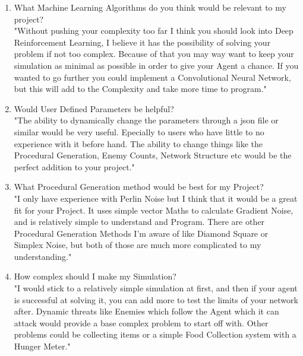 \begin{flushleft}
\begin{enumerate}
                \vspace{0.5cm}
                \item {\large What Machine Learning Algorithms do you think would be relevant to my project?} \\
                \vspace{0.2cm}
                "Without pushing your complexity too far I think you should look into Deep Reinforcement Learning, I believe it has the
                possibility of solving your problem if not too complex. Because of that you may way want to keep your simulation as minimal
                as possible in order to give your Agent a chance. If you wanted to go further you could implement a Convolutional Neural Network, 
                but this will add to the Complexity and take more time to program."

                \vspace{0.5cm}
                \item {\large Would User Defined Parameters be helpful?} \\
                \vspace{0.2cm}
                "The ability to dynamically change the parameters through a json file or similar would be very useful. Epecially to users who
                have little to no experience with it before hand. The ability to change things like the Procedural Generation, Enemy Counts, 
                Network Structure etc would be the perfect addition to your project."

                \vspace{0.5cm}
                \item {\large What Procedural Generation method would be best for my Project?} \\
                \vspace{0.2cm}
                "I only have experience with Perlin Noise but I think that it would be a great fit for your Project. It uses simple vector Maths
                to calculate Gradient Noise, and is relatively simple to understand and Program. There are other Procedural Generation Methods
                I'm aware of like Diamond Square or Simplex Noise, but both of those are much more complicated to my understanding."

                \vspace{0.5cm}
                \item {\large How complex should I make my Simulation?} \\
                \vspace{0.2cm}
                "I would stick to a relatively simple simulation at first, and then if your agent is successful at solving it, you can add more
                to test the limits of your network after. Dynamic threats like Enemies which follow the Agent which it can attack would provide a base 
                complex problem to start off with. Other problems could be collecting items or a simple Food Collection system with a Hunger Meter."


\end{enumerate}
\end{flushleft}
